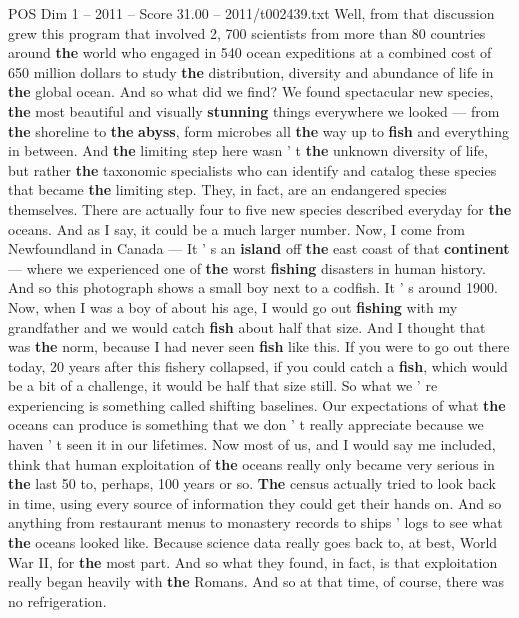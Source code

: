 \begin{textsample}{POS Dim 1 – 2011 – Score 31.00 – 2011/t002439.txt}
Well, from that discussion grew this program that involved 2, 700 scientists from more than 80 countries around \textbf{the} world who engaged in 540 ocean expeditions at a combined cost of 650 million dollars to study \textbf{the} distribution, diversity and abundance of life in \textbf{the} global ocean.
And so what did we find?
We found spectacular new species, \textbf{the} most beautiful and visually \textbf{stunning} things everywhere we looked — from \textbf{the} shoreline to \textbf{the} \textbf{abyss}, form microbes all \textbf{the} way up to \textbf{fish} and everything in between.
And \textbf{the} limiting step here wasn ' t \textbf{the} unknown diversity of life, but rather \textbf{the} taxonomic specialists who can identify and catalog these species that became \textbf{the} limiting step.
They, in fact, are an endangered species themselves.
There are actually four to five new species described everyday for \textbf{the} oceans.
And as I say, it could be a much larger number.
Now, I come from Newfoundland in Canada — It ' s an \textbf{island} off \textbf{the} east coast of that \textbf{continent} — where we experienced one of \textbf{the} worst \textbf{fishing} disasters in human history.
And so this photograph shows a small boy next to a codfish.
It ' s around 1900.
Now, when I was a boy of about his age, I would go out \textbf{fishing} with my grandfather and we would catch \textbf{fish} about half that size.
And I thought that was \textbf{the} norm, because I had never seen \textbf{fish} like this.
If you were to go out there today, 20 years after this fishery collapsed, if you could catch a \textbf{fish}, which would be a bit of a challenge, it would be half that size still.
So what we ' re experiencing is something called shifting baselines.
Our expectations of what \textbf{the} oceans can produce is something that we don ' t really appreciate because we haven ' t seen it in our lifetimes.
Now most of us, and I would say me included, think that human exploitation of \textbf{the} oceans really only became very serious in \textbf{the} last 50 to, perhaps, 100 years or so. \textbf{The} census actually tried to look back in time, using every source of information they could get their hands on.
And so anything from restaurant menus to monastery records to ships ' logs to see what \textbf{the} oceans looked like.
Because science data really goes back to, at best, World War II, for \textbf{the} most part.
And so what they found, in fact, is that exploitation really began heavily with \textbf{the} Romans.
And so at that time, of course, there was no refrigeration.

\end{textsample}
